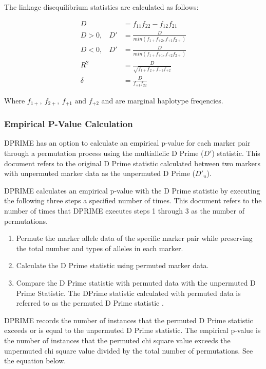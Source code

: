The linkage disequilibrium statistics are calculated as follows:

\begin{align*}
  D &= f_{11}f_{22} - f_{12}f_{21} \\
  D>0, ~~~~ D' &= \frac{D}{min(f_{1+}f_{+2},f_{+1}f_{2+})} \\
  D<0, ~~~~ D' &= \frac{D}{min(f_{1+}f_{+1},f_{+2}f_{2+})} \\
  R^2 &= \frac{D}{\sqrt{f_{1+}f_{2+}f_{+1}f_{+2}}} \\
  \delta &= \frac{D}{f_{+1}f_{22}}
\end{align*}

Where $f_{1+}, ~ f_{2+}, ~ f_{+1} \text{ and } f_{+2}$ and are marginal
haplotype freqencies.

\subsubsection{Empirical P-Value Calculation}

DPRIME has an option to calculate an empirical p-value for each marker pair
through a permutation process using the multiallelic D Prime ($D'$) statistic.
This document refers to the original D Prime statistic calculated between two
markers with unpermuted marker data as the unpermuted D Prime ($D'_u$).

DPRIME calculates an empirical p-value with the D Prime statistic by executing
the following three steps a specified number of times.  This document refers to
the number of times that DPRIME executes steps 1 through 3 as the number of
permutations.

\begin{enumerate}
\item Permute the marker allele data of the specific marker pair while
  preserving the total number and types of alleles in each marker.

\item Calculate the D Prime statistic using permuted marker data.

\item Compare the D Prime statistic with permuted data with the unpermuted D
  Prime Statistic.  The DPrime statistic calculated with permuted data is
  referred to as the permuted D Prime statistic .
\end{enumerate}

DPRIME records the number of instances that the permuted D Prime statistic
exceeds or is equal to the unpermuted D Prime statistic.  The empirical p-value
is the number of instances that the permuted chi square value exceeds the
unpermuted chi square value divided by the total number of permutations.  See
the equation below.

